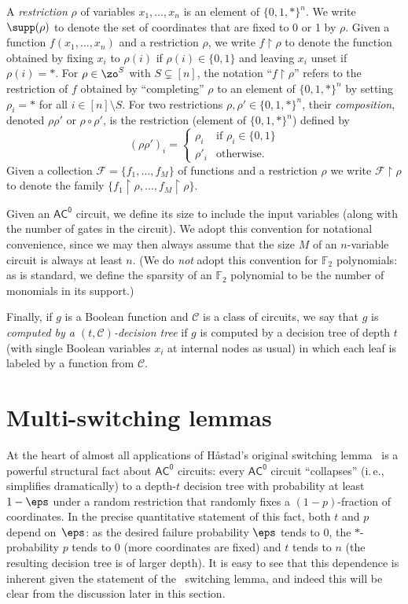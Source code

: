 \documentclass[11pt]{article}
\numberwithin{equation}{section}
\theoremstyle{definition}
\theoremstyle{plain}
\newcommand{\ie}{i.\,e.}
\theoremstyle{plain}
\newcommand{\acz}{\mathsf{AC^0}}
\newcommand{\uhr}{\upharpoonright}
\renewcommand{\F}{\mathds{F}}
\begin{document}
A \emph{restriction} $\rho$ of variables $x_1,\dots,x_n$ is an element of $\{0,1,\ast\}^n$. We write $\supp(\rho)$ to denote the set of coordinates that are fixed to 0 or 1 by $\rho$.
Given a function $f(x_1,\dots,x_n)$ and a restriction $\rho$, we write $f \uhr \rho$ to denote the function obtained by fixing $x_i$ to $\rho(i)$ if $\rho(i) \in \{0,1\}$ and leaving $x_i$ unset if $\rho(i)=\ast.$
For $\rho \in \zo^{S}$ with $S \subsetneq [n]$,  the notation ``$f \uhr \rho$'' refers to the restriction of $f$ obtained by ``completing'' $\rho$ to an element of $\{0,1,\ast\}^n$ by setting $\rho_i=\ast$ for all $i \in [n]\setminus S.$
 For two restrictions $\rho,\rho'\in \{0,1,\ast\}^{n}$, their \emph{composition}, denoted $\rho\rho'$ or $\rho \circ \rho'$, is the restriction (element of $\{0,1,\ast\}^{n}$) defined by
\[ (\rho\rho')_i = \left\{
\begin{array}{cl}
\rho_i & \text{if $\rho_i \in \{0,1\}$} \\
\rho'_i & \text{otherwise.}
\end{array}
\right.\]
Given a collection $\mathscr{F} = \{f_1,\ldots,f_M\}$ of functions and a restriction $\rho$ we write $\mathscr{F} \uhr \rho$ to denote the family $\{f_1 \uhr \rho,\ldots,f_M\uhr\rho\}$. 

Given an $\acz$ circuit, we define its size to include the input variables (along with the number of gates in the circuit). We adopt this convention for notational convenience, since we may then always assume that the size $M$ of an $n$-variable circuit is always at least $n$. (We do \emph{not} adopt this convention for $\F_2$ polynomials: as is standard, we define the sparsity of an $\F_2$ polynomial to be the number of monomials in its support.)

Finally, if $g$ is a Boolean function and $\mathscr{C}$ is a class of circuits, we say that
$g$ is \emph{computed by a $(t,\mathscr{C})$-decision tree} if $g$ is computed by a decision tree of depth $t$ (with single Boolean 
variables $x_i$ at internal nodes as usual) in which each leaf is labeled by a function from $\mathscr{C}.$

\section{Multi-switching lemmas} \label{sec:hastad-vs-hastad}

At the heart of almost all applications of H{\aa}stad's original switching lemma~\cite{Hastad86} is a powerful structural fact about $\acz$ circuits: every $\acz$ circuit ``collapses'' (\ie, simplifies dramatically) to a depth-$t$ decision tree with probability at least $1-\eps$ under a random restriction that randomly fixes a $(1-p)$-fraction of coordinates.  In the precise quantitative statement of this fact, both $t$ and $p$ depend on~$\eps$: as the desired failure probability $\eps$ tends to $0$, the $\ast$-probability $p$ tends to $0$ (more coordinates are fixed) and $t$ tends to $n$ (the resulting decision tree is of larger depth). It is easy to see that this dependence is inherent given the statement of the~\cite{Hastad86} switching lemma, and indeed this will be clear from the discussion later in this section.
\end{document}
